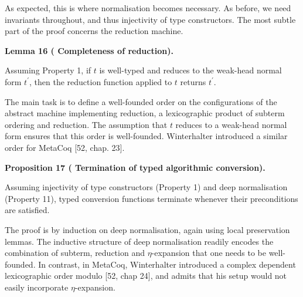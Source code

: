 As expected, this is where normalisation becomes necessary. As before, we need invariants throughout, and thus injectivity of type constructors. The most subtle part of the proof concerns the reduction machine.\par
 
 
 
\par\medskip\noindent\textbf{Lemma 16 (  Completeness of reduction).}\par
 
 
Assuming Property 1, if $t$ is well-typed and reduces to the weak-head normal form $t^{\prime}$, then the reduction function applied to $t$ returns $t^{\prime}$.\par
 
 
 
 
The main task is to define a well-founded order on the configurations of the abstract machine implementing reduction, a lexicographic product of subterm ordering and reduction. The assumption that $t$ reduces to a weak-head normal form ensures that this order is well-founded. Winterhalter introduced a similar order for MetaCoq [52, chap. 23].\par
 
 
 
\par\medskip\noindent\textbf{Proposition 17 (  Termination of typed algorithmic conversion).}\par
 
 
Assuming injectivity of type constructors (Property 1) and deep normalisation (Property 11), typed conversion functions terminate whenever their preconditions are satisfied.\par
 
 
 
 
The proof is by induction on deep normalisation, again using local preservation lemmas. The inductive structure of deep normalisation readily encodes the combination of subterm, reduction and $\eta$-expansion that one needs to be well-founded. In contrast, in MetaCoq, Winterhalter introduced a complex dependent lexicographic order modulo [52, chap 24], and admits that his setup would not easily incorporate $\eta$-expansion.\par
 
